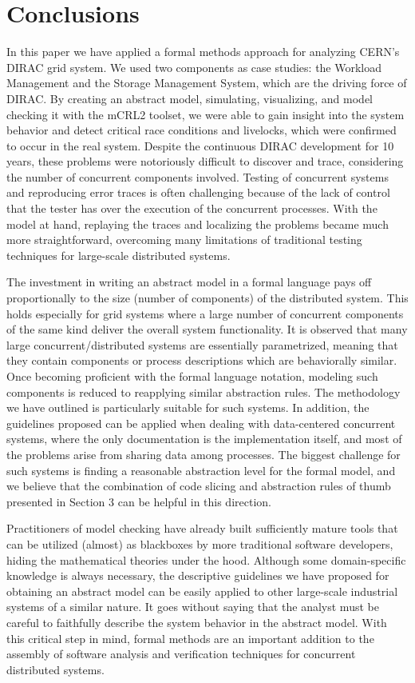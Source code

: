 \documentclass[sort&compress,preprint,3p]{elsarticle}
\begin{document}
\section{Conclusions}
\label{sec:Section_5}
In this paper we have applied a formal methods approach for analyzing CERN's 
DIRAC grid system. 
We used two components as case studies: the Workload
Management and the Storage Management System, which are the driving force 
of DIRAC.
By creating an abstract model, simulating, visualizing, and model checking it with the mCRL2 toolset,
we were able to gain insight into the system behavior and detect critical
race conditions and livelocks, which  
were confirmed to occur in the real system. 
Despite the continuous DIRAC development for 10 years, these problems 
were notoriously difficult to discover and trace, considering the number of concurrent components involved. 
Testing of concurrent systems and reproducing error traces is often challenging because of the lack of 
control that the tester has over the execution of the concurrent processes. 
With the model at hand, replaying
the traces and localizing the problems became much more straightforward, overcoming many limitations of
traditional testing techniques for large-scale distributed systems. 

The investment in writing an abstract model in a formal language 
pays off proportionally to the size (number of components) of the distributed system. 
This holds especially for grid systems where a large number of concurrent
components of the same kind deliver the overall system functionality. 
It is observed that many large concurrent/distributed systems are essentially
parametrized, meaning that they contain components or process descriptions
which are behaviorally similar. Once becoming proficient with
the formal language notation, modeling such components is
reduced to reapplying similar abstraction rules. The methodology we have outlined is particularly
suitable for such systems. In addition, the guidelines proposed can be applied
when dealing with data-centered concurrent systems, where the only documentation
is the implementation itself, and most of the problems arise from sharing data among 
processes. The biggest challenge for such systems is finding a reasonable abstraction
level for the formal model, and we believe that the combination of code slicing and
abstraction rules of thumb presented in Section 3 can be helpful in this direction. 

Practitioners
of model checking have already built sufficiently mature tools
that can be utilized (almost) as blackboxes by more traditional
software developers, hiding the mathematical theories under
the hood. Although some domain-specific knowledge is always necessary,
the descriptive guidelines we have proposed for obtaining
an abstract model can be easily 
applied to other large-scale industrial systems of a similar nature.
It goes without saying that the analyst must be careful to faithfully
describe the system behavior in the abstract model. With this critical step in mind, formal methods
are an important addition to the assembly of software analysis and verification techniques for concurrent distributed systems.
\end{document}
